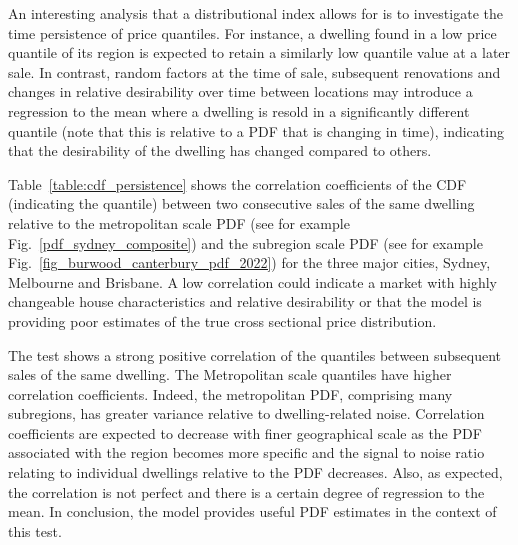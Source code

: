 An interesting analysis that a distributional index allows for is to investigate the time persistence of price quantiles. For instance, a dwelling found in a low price quantile of its region is expected to retain a similarly low quantile value at a later sale. 
In contrast, random factors at the time of sale, subsequent renovations and changes in relative desirability over time between locations may introduce a regression to the mean where a dwelling is resold in a significantly different quantile (note that this is relative to a PDF that is changing in time), indicating that the desirability of the dwelling has changed compared to others. 


Table~\ref{table:cdf_persistence} shows the correlation coefficients of the CDF (indicating the quantile) between two consecutive sales of the same dwelling relative to the metropolitan scale PDF (see for example Fig.~\ref{pdf_sydney_composite}) and the subregion scale PDF (see for example Fig.~\ref{fig_burwood_canterbury_pdf_2022}) for the three major cities, Sydney, Melbourne and Brisbane. 
A low correlation could indicate a market with highly changeable house characteristics and relative desirability or that the model is providing poor estimates of the true cross sectional price distribution. 


The test shows a strong positive correlation of the quantiles between subsequent sales of the same dwelling. The Metropolitan scale quantiles have higher correlation coefficients. Indeed, the metropolitan PDF, comprising many subregions, has greater variance relative to dwelling-related noise. Correlation coefficients are expected to decrease with finer geographical scale as the PDF associated with the region becomes more specific and the signal to noise ratio relating to individual dwellings relative to the PDF decreases.  Also, as expected, the correlation is not perfect and there is a certain degree of regression to the mean. In conclusion, the model provides useful PDF estimates in the context of this test.

